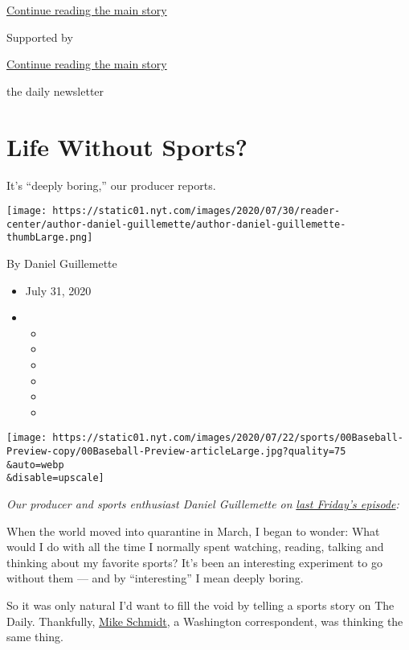 \protect\hyperlink{after-top}{Continue reading the main story}

Supported by

\protect\hyperlink{after-sponsor}{Continue reading the main story}

the daily newsletter

\hypertarget{life-without-sports}{%
\section{Life Without Sports?}\label{life-without-sports}}

It's ``deeply boring,'' our producer reports.

\texttt{[image: https://static01.nyt.com/images/2020/07/30/reader-center/author-daniel-guillemette/author-daniel-guillemette-thumbLarge.png]}

By Daniel Guillemette

\begin{itemize}
\item
  July 31, 2020
\item
  \begin{itemize}
  \item
  \item
  \item
  \item
  \item
  \item
  \end{itemize}
\end{itemize}

\texttt{[image: https://static01.nyt.com/images/2020/07/22/sports/00Baseball-Preview-copy/00Baseball-Preview-articleLarge.jpg?quality=75\\\&auto=webp\\\&disable=upscale]}

\emph{Our producer and sports enthusiast Daniel Guillemette on}
\href{https://www.nytimes.com/2020/07/24/podcasts/the-daily/mlb-baseball-season-coronavirus.html}{\emph{last
Friday's episode}}\emph{:}

When the world moved into quarantine in March, I began to wonder: What
would I do with all the time I normally spent watching, reading, talking
and thinking about my favorite sports? It's been an interesting
experiment to go without them --- and by ``interesting'' I mean deeply
boring.

So it was only natural I'd want to fill the void by telling a sports
story on The Daily. Thankfully,
\href{https://www.nytimes.com/by/michael-s-schmidt}{Mike Schmidt}, a
Washington correspondent, was thinking the same thing.

